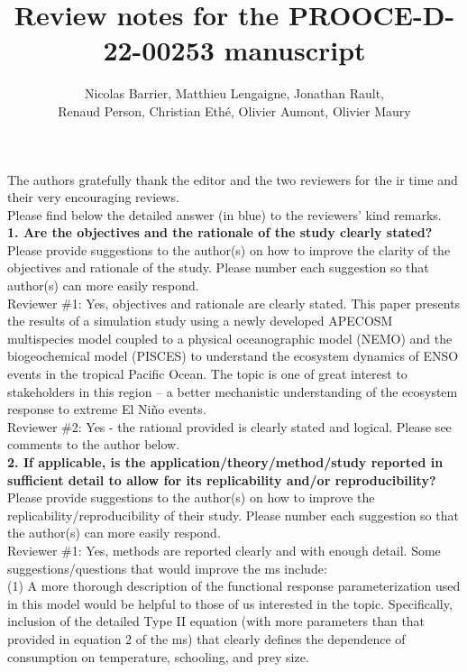 \documentclass[12pt]{article}
\author{Nicolas Barrier, Matthieu Lengaigne, Jonathan Rault,\\Renaud Person, Christian Eth\'{e}, Olivier Aumont, Olivier Maury}
\title{Review notes for the PROOCE-D-22-00253 manuscript}
\begin{document}
\onehalfspacing

\maketitle

The authors gratefully thank the editor and the two reviewers for the	ir time and their very encouraging reviews. \\

Please find below the detailed answer (in blue) to the reviewers' kind remarks. \\

\textbf{1. Are the objectives and the rationale of the study clearly stated?} \\

Please provide suggestions to the author(s) on how to improve the clarity of the objectives and rationale of the study. Please number each suggestion so that author(s) can more easily respond.\\	

Reviewer \#1: Yes, objectives and rationale are clearly stated. This paper presents the results of a simulation study using a newly developed APECOSM multispecies model coupled to a physical oceanographic model (NEMO) and the biogeochemical model (PISCES) to understand the ecosystem dynamics of ENSO events in the tropical Pacific Ocean. The topic is one of great interest to stakeholders in this region – a better mechanistic understanding of the ecosystem response to extreme El Niño events. \\

Reviewer \#2: Yes - the rational provided is clearly stated and logical. Please see comments to the author below.\\

\textbf{2. If applicable, is the application/theory/method/study reported in sufficient detail to allow for its replicability and/or reproducibility?} \\ 

Please provide suggestions to the author(s) on how to improve the replicability/reproducibility of their study. Please number each suggestion so that the author(s) can more easily respond. \\

Reviewer \#1: Yes, methods are reported clearly and with enough detail. Some suggestions/questions that would improve the ms include: \\

(1) A more thorough description of the functional response parameterization used in this model would be helpful to those of us interested in the topic. Specifically, inclusion of the detailed Type II equation (with more parameters than that provided in equation 2 of the ms) that clearly defines the dependence of consumption on temperature, schooling, and prey size. \\
\end{document}
